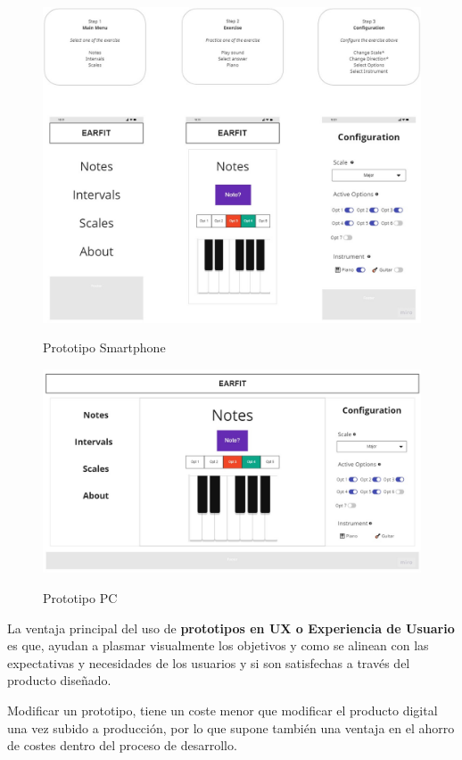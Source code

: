 \documentclass[12pt,twoside,titlepage]{report}
\begin{document}
\begin{figure}[H]
    \centering
    \includegraphics[scale=0.37]{Wireframes}
    \label{fig:Wireframes}
    \caption{Prototipo Smartphone}
\end{figure}

\begin{figure}[H]
    \centering
    \includegraphics[scale=0.3]{WireframePC}
    \label{fig:WireframePC}
    \caption{Prototipo PC}
\end{figure}

La ventaja principal del uso de \textbf{prototipos en UX o Experiencia de Usuario} es que, ayudan a plasmar visualmente los objetivos y como se alinean con las expectativas y necesidades de los usuarios y si son satisfechas a través del producto diseñado.

Modificar un prototipo, tiene un coste menor que modificar el producto digital una vez subido a producción, por lo que supone también una ventaja en el ahorro de costes dentro del proceso de desarrollo.
\end{document}
